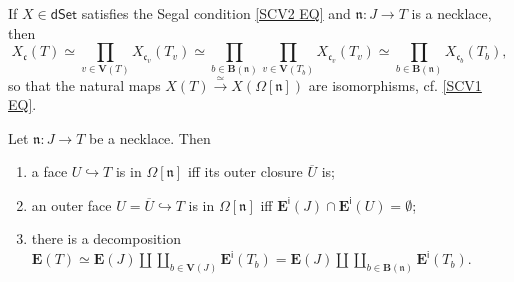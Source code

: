 \documentclass{hha}
\theoremstyle{definition} %
\newcommand{\dSet}{\mathsf{dSet}}
\begin{document}
\begin{remark}\label{SEGFORNECK REM}
	If $X\in \dSet$ satisfies the Segal condition \eqref{SCV2 EQ}
	and $\mathfrak{n}\colon J \to T$ is a necklace, then	
	\[
                X_{\mathfrak{c}}(T)
                \simeq 
                \prod_{v \in \boldsymbol{V}(T)}
                X_{\mathfrak{c}_v}(T_v)
                \simeq
                \prod_{b \in \boldsymbol{B}(\mathfrak{n})}
                \prod_{v \in \boldsymbol{V}(T_b)}
                X_{\mathfrak{c}_v}(T_v)
                \simeq
                \prod_{b \in \boldsymbol{B}(\mathfrak{n})}
                X_{\mathfrak{c}_b}(T_b),
	\]
	so that the natural maps
	$X(T) \xrightarrow{\simeq} X(\Omega[\mathfrak{n}])$
	are isomorphisms, cf. \eqref{SCV1 EQ}.
\end{remark}





\begin{lemma}\label{FACEINNECK LEM}
	Let $\mathfrak{n} \colon J \to T$ be a necklace. Then
	\begin{enumerate}[label=(\roman*)]
		\item a face $U \hookrightarrow T$
		is in $\Omega[\mathfrak{n}]$
		iff its outer closure $\overline{U}$ is; 
		\item an outer face 
		$U = \overline{U} \hookrightarrow T$
		is in $\Omega[\mathfrak{n}]$ iff 
		$\boldsymbol{E}^{\mathsf{i}}(J) \cap 
		\boldsymbol{E}^{\mathsf{i}}(U) = \emptyset$;
		\item there is a decomposition
		$
		\boldsymbol{E}(T) \simeq
		\boldsymbol{E}(J) \amalg 
		\coprod_{b \in \boldsymbol{V}(J)}
		\boldsymbol{E}^{\mathsf{i}}(T_b)
		= 
		\boldsymbol{E}(J) \amalg 
		\coprod_{b \in \boldsymbol{B}(\mathfrak{n})}
		\boldsymbol{E}^{\mathsf{i}}(T_b)
		$.
	\end{enumerate}
\end{lemma}
\end{document}
